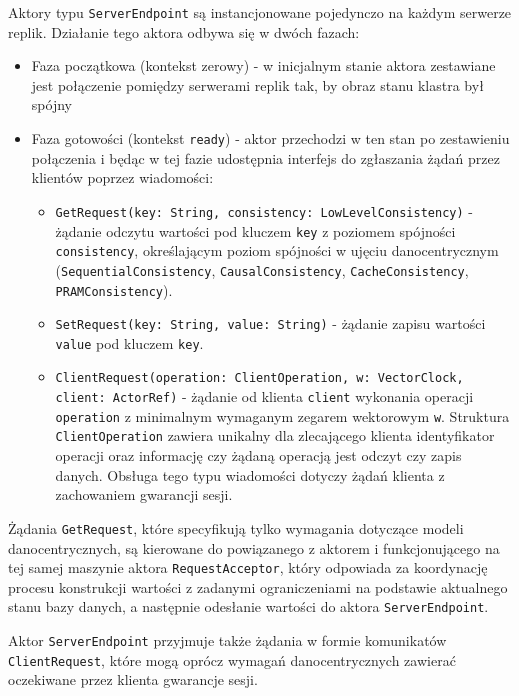 Aktory typu \texttt{ServerEndpoint} są instancjonowane pojedynczo na każdym serwerze replik. Działanie tego aktora odbywa się w dwóch fazach:
\begin{itemize}
    \item Faza początkowa (kontekst zerowy) - w inicjalnym stanie aktora zestawiane jest połączenie pomiędzy serwerami replik tak, by obraz stanu klastra był spójny
    \item Faza gotowości (kontekst \texttt{ready}) - aktor przechodzi w ten stan po zestawieniu połączenia i będąc w tej fazie udostępnia interfejs do zgłaszania żądań przez klientów poprzez wiadomości:
    \begin{itemize}
        \item \texttt{GetRequest(key: String, consistency: LowLevelConsistency)} - żądanie odczytu wartości pod kluczem \texttt{key} z poziomem spójności \texttt{consistency}, określającym poziom spójności w ujęciu danocentrycznym (\texttt{SequentialConsistency}, \texttt{CausalConsistency}, \texttt{CacheConsistency}, \texttt{PRAMConsistency}).
        \item \texttt{SetRequest(key: String, value: String)} - żądanie zapisu wartości \texttt{value} pod kluczem \texttt{key}.
        \item \texttt{ClientRequest(operation: ClientOperation, w: VectorClock, client: ActorRef)} - żądanie od klienta \texttt{client} wykonania operacji \texttt{operation} z minimalnym wymaganym zegarem wektorowym \texttt{w}. Struktura \texttt{ClientOperation} zawiera unikalny dla zlecającego klienta identyfikator operacji oraz informację czy żądaną operacją jest odczyt czy zapis danych. Obsługa tego typu wiadomości dotyczy żądań klienta z zachowaniem gwarancji sesji.
    \end{itemize}

\end{itemize}
Żądania \texttt{GetRequest}, które specyfikują tylko wymagania dotyczące modeli danocentrycznych, są kierowane do powiązanego z aktorem i funkcjonującego na tej samej maszynie aktora \texttt{RequestAcceptor}, który odpowiada za koordynację procesu konstrukcji wartości z zadanymi ograniczeniami na podstawie aktualnego stanu bazy danych, a następnie odesłanie wartości do aktora \texttt{ServerEndpoint}.

Aktor \texttt{ServerEndpoint} przyjmuje także żądania w formie komunikatów \texttt{ClientRequest}, które mogą oprócz wymagań danocentrycznych zawierać oczekiwane przez klienta gwarancje sesji. %

